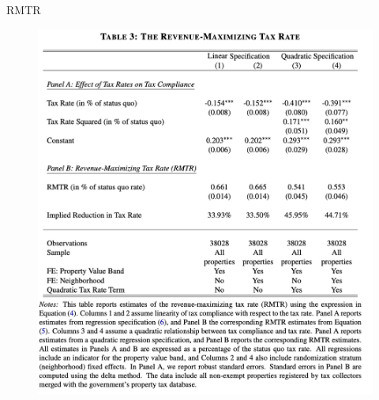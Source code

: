 \documentclass{beamer}
\begin{document}
\begin{frame}{RMTR}
\begin{figure}
    \centering
    \includegraphics[width=\textwidth,height=0.8\textheight]{Paper Presentations/The State Capacity Ceiling on Tax Rates/T3.png}
    \label{fig:enter-label}
\end{figure}
\end{frame}
\end{document}
